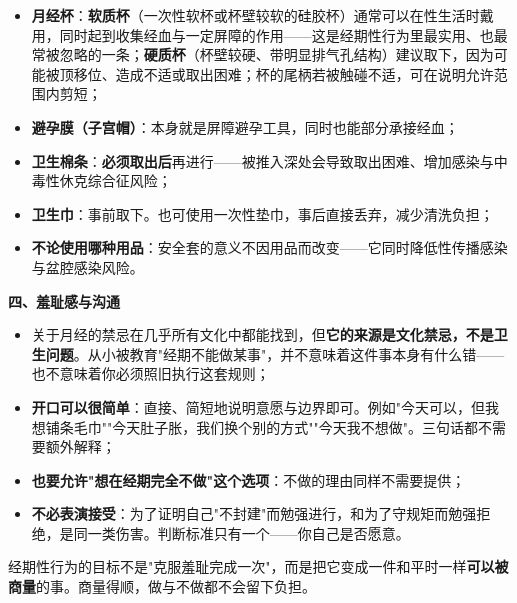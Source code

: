\begin{itemize}
\item \textbf{月经杯}：\textbf{软质杯}（一次性软杯或杯壁较软的硅胶杯）通常可以在性生活时戴用，同时起到收集经血与一定屏障的作用——这是经期性行为里最实用、也最常被忽略的一条；\textbf{硬质杯}（杯壁较硬、带明显排气孔结构）建议取下，因为可能被顶移位、造成不适或取出困难；杯的尾柄若被触碰不适，可在说明允许范围内剪短；
\item \textbf{避孕膜（子宫帽）}：本身就是屏障避孕工具，同时也能部分承接经血；
\item \textbf{卫生棉条}：\textbf{必须取出后}再进行——被推入深处会导致取出困难、增加感染与中毒性休克综合征风险；
\item \textbf{卫生巾}：事前取下。也可使用一次性垫巾，事后直接丢弃，减少清洗负担；
\item \textbf{不论使用哪种用品}：安全套的意义不因用品而改变——它同时降低性传播感染与盆腔感染风险。
\end{itemize}

\textbf{四、羞耻感与沟通}

\begin{itemize}
\item 关于月经的禁忌在几乎所有文化中都能找到，但\textbf{它的来源是文化禁忌，不是卫生问题}。从小被教育"经期不能做某事"，并不意味着这件事本身有什么错——也不意味着你必须照旧执行这套规则；
\item \textbf{开口可以很简单}：直接、简短地说明意愿与边界即可。例如"今天可以，但我想铺条毛巾""今天肚子胀，我们换个别的方式""今天我不想做"。三句话都不需要额外解释；
\item \textbf{也要允许"想在经期完全不做"这个选项}：不做的理由同样不需要提供；
\item \textbf{不必表演接受}：为了证明自己"不封建"而勉强进行，和为了守规矩而勉强拒绝，是同一类伤害。判断标准只有一个——你自己是否愿意。
\end{itemize}

\begin{tcolorbox}[colback=pink!5!white,colframe=red!50!black,title=贴心小叮咛]
经期性行为的目标不是"克服羞耻完成一次"，而是把它变成一件和平时一样\textbf{可以被商量}的事。商量得顺，做与不做都不会留下负担。
\end{tcolorbox}

